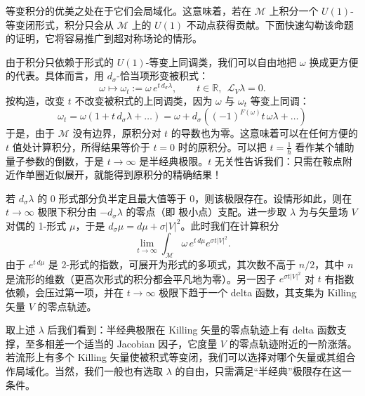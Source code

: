 等变积分的优美之处在于它们会局域化。这意味着，若在 $\mathcal{M}$ 上积分一个 $U(1)$-等变闭形式，积分只会从 $\mathcal{M}$ 上的 $U(1)$ 不动点获得贡献。下面快速勾勒该命题的证明，它将容易推广到超对称场论的情形。

由于积分只依赖于形式的 $U(1)$-等变上同调类，我们可以自由地把 $\omega$ 换成更方便的代表。具体而言，用 $d_\sigma$-恰当项形变被积式：
\begin{equation}\tag{A.2}
\omega \mapsto \omega_t := \omega\, e^{t\,d_\sigma\lambda},\qquad t\in\mathbb{R},\ \ \mathcal{L}_V\lambda=0.
\end{equation}
按构造，改变 $t$ 不改变被积式的上同调类，因为 $\omega$ 与 $\omega_t$ 等变上同调：
\begin{equation}\tag{A.3}
\omega_t = \omega\left(1+t\,d_\sigma\lambda+\ldots\right) = \omega + d_\sigma\left((-1)^{F(\omega)}t\,\omega\lambda+\ldots\right)
\end{equation}
于是，由于 $\mathcal{M}$ 没有边界，原积分对 $t$ 的导数也为零。这意味着可以在任何方便的 $t$ 值处计算积分，所得结果等价于 $t=0$ 时的原积分。可以把 $t=\frac{1}{\hbar}$ 看作某个辅助量子参数的倒数，于是 $t\to\infty$ 是半经典极限。$t$ 无关性告诉我们：只需在鞍点附近作单圈近似展开，就能得到原积分的精确结果！

若 $d_\sigma\lambda$ 的 0 形式部分负半定且最大值等于 0，则该极限存在。设情形如此，则在 $t\to\infty$ 极限下积分由 $-d_\sigma\lambda$ 的零点（即
极小点）支配。进一步取 $\lambda$ 为与矢量场 $V$ 对偶的 1-形式 $\mu$，于是 $d_\sigma\mu = d\mu+\sigma|V|^2$。此时我们在计算积分
\begin{equation}\tag{A.4}
\lim_{t\to\infty}\int_{\mathcal{M}}\omega\, e^{t\,d\mu} e^{\sigma t|V|^2}.
\end{equation}
由于 $e^{t\,d\mu}$ 是 2-形式的指数，可展开为形式的多项式，其次数不高于 $n/2$，其中 $n$ 是流形的维数（更高次形式的积分都会平凡地为零）。另一因子 $e^{\sigma t|V|^2}$ 对 $t$ 有指数依赖，会压过第一项，并在 $t\to\infty$ 极限下趋于一个 delta 函数，其支集为 Killing 矢量 $V$ 的零点轨迹。

取上述 $\lambda$ 后我们看到：半经典极限在 Killing 矢量的零点轨迹上有 delta 函数支撑，至多相差一个适当的 Jacobian 因子，它度量 $V$ 的零点轨迹附近的一阶涨落。若流形上有多个 Killing 矢量使被积式等变闭，我们可以选择对哪个矢量或其组合作局域化。当然，我们一般也有选取 $\lambda$ 的自由，只需满足“半经典”极限存在这一条件。

